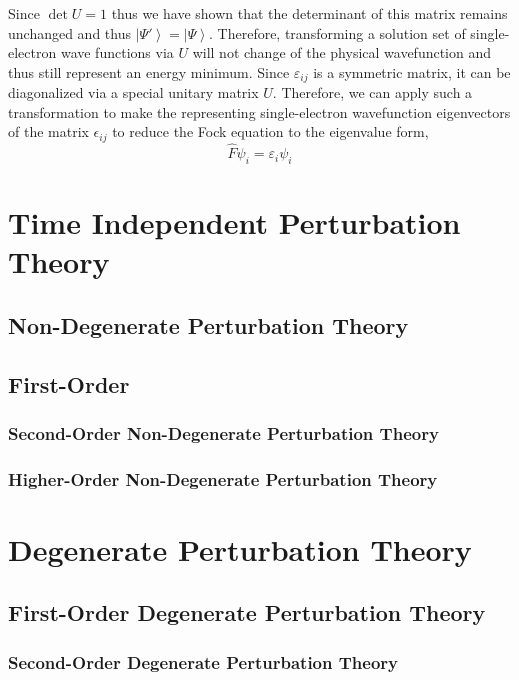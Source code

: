 \documentclass[12pt]{extarticle}
\theoremstyle{definition}
\newcommand{\ket}[1]{\left| #1 \right>}
\begin{document}
Since $\det{U} = 1$ thus we have shown that the determinant of this matrix remains unchanged and thus $\ket{\Psi'} = \ket{\Psi}$. Therefore, transforming a solution set of single-electron wave functions via $U$ will not change of the physical wavefunction and thus still represent an energy minimum. Since $\varepsilon_{ij}$ is a symmetric matrix, it can be diagonalized via a special unitary matrix $U$. Therefore, we can apply such a transformation to make the representing single-electron wavefunction eigenvectors of the matrix $\epsilon_{ij}$ to reduce the Fock equation to the eigenvalue form,
\[ \hat{F} \psi_i = \varepsilon_{i} \psi_i \] 

\section{Time Independent Perturbation Theory}

\subsection{Non-Degenerate Perturbation Theory}

\subsection{First-Order}

\subsubsection{Second-Order Non-Degenerate Perturbation Theory}

\subsubsection{Higher-Order Non-Degenerate Perturbation Theory}

\section{Degenerate Perturbation Theory}

\subsection{First-Order Degenerate Perturbation Theory}

\subsubsection{Second-Order Degenerate Perturbation Theory}
\end{document}
